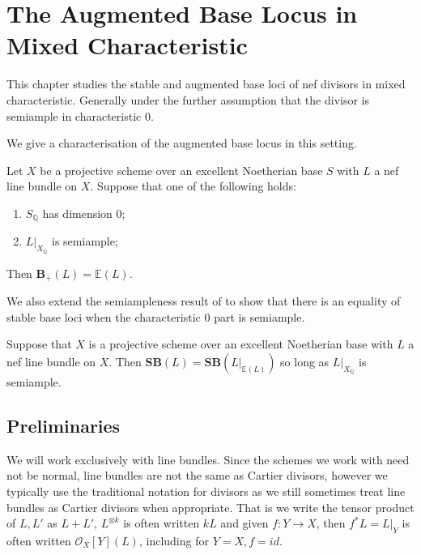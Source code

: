 \documentclass[a4paper,12pt]{book}
\newcommand{\SB}{\mathbf{SB}}
\newcommand{\BS}{\mathbf{B}_{+}}
\newcommand{\ox}{\mathcal{O}_{X}}
\begin{document}
\chapter{The Augmented Base Locus in Mixed Characteristic}

This chapter studies the stable and augmented base loci of nef divisors in mixed characteristic. Generally under the further assumption that the divisor is semiample in characteristic $0$.

We give a characterisation of the augmented base locus in this setting.

\begin{theorem}
Let $X$ be a projective scheme over an excellent Noetherian base $S$ with $L$ a nef line bundle on $X$. 
Suppose that one of the following holds:
\begin{enumerate}
	\item $S_{\mathbb{Q}}$ has dimension $0$;
	\item $L|_{X_{\mathbb{Q}}}$ is semiample;
\end{enumerate}

Then $\BS(L)=\mathbb{E}(L)$.
\end{theorem}

We also extend the semiampleness result of \cite{witaszek2020keel} to show that there is an equality of stable base loci when the characteristic $0$ part is semiample.
 
 \begin{theorem}
 	Suppose that $X$ is a projective scheme over an excellent Noetherian base with $L$ a nef line bundle on $X$. Then $\SB(L)=\SB(L|_{\mathbb{E}(L)})$ so long as $L|_{X_{\mathbb{Q}}}$ is semiample.
 \end{theorem}


\section{Preliminaries}

We will work exclusively with line bundles. Since the schemes we work with need not be normal, line bundles are not the same as Cartier divisors, however we typically use the traditional notation for divisors as we still sometimes treat line bundles as Cartier divisors when appropriate. That is we write the tensor product of $L,L'$ as $L+L'$, $L^{\otimes k}$ is often written $kL$ and given $f:Y \to X$, then $f^{*}L=L|_{Y}$ is often written $\ox[Y](L)$, including for $Y=X, f=id$. 
\end{document}
